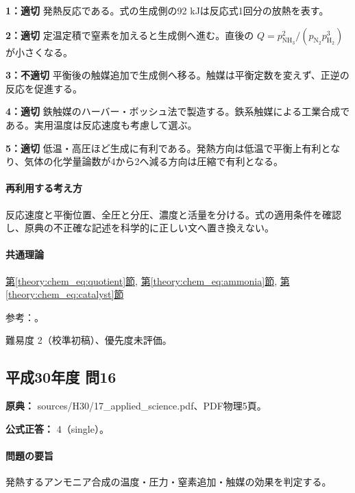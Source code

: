 \noindent\textbf{1：適切} 発熱反応である。式の生成側の92 kJは反応式1回分の放熱を表す。\par

\noindent\textbf{2：適切} 定温定積で窒素を加えると生成側へ進む。直後の \(Q=p_{\mathrm{NH_3}}^2/(p_{\mathrm{N_2}}p_{\mathrm{H_2}}^3)\) が小さくなる。\par

\noindent\textbf{3：不適切} 平衡後の触媒追加で生成側へ移る。触媒は平衡定数を変えず、正逆の反応を促進する。\par

\noindent\textbf{4：適切} 鉄触媒のハーバー・ボッシュ法で製造する。鉄系触媒による工業合成である。実用温度は反応速度も考慮して選ぶ。\par

\noindent\textbf{5：適切} 低温・高圧ほど生成に有利である。発熱方向は低温で平衡上有利となり、気体の化学量論数が4から2へ減る方向は圧縮で有利となる。\par

\paragraph{再利用する考え方} 反応速度と平衡位置、全圧と分圧、濃度と活量を分ける。式の適用条件を確認し、原典の不正確な記述を科学的に正しい文へ置き換えない。

\paragraph{共通理論} \hyperref[theory:chem_eq:quotient]{第\ref*{theory:chem_eq:quotient}節}, \hyperref[theory:chem_eq:ammonia]{第\ref*{theory:chem_eq:ammonia}節}, \hyperref[theory:chem_eq:catalyst]{第\ref*{theory:chem_eq:catalyst}節}

\par 参考：\cite{iupac_greenbook2012}。

\par 難易度 2（校準初稿）、優先度未評価。

\subsection{平成30年度 問16}
\label{q:h30-reg-applied-16}

\noindent\textbf{原典：} sources/H30/17\_applied\_science.pdf、PDF物理5頁。

\textbf{公式正答：} 4（single）。

\paragraph{問題の要旨} 発熱するアンモニア合成の温度・圧力・窒素追加・触媒の効果を判定する。

